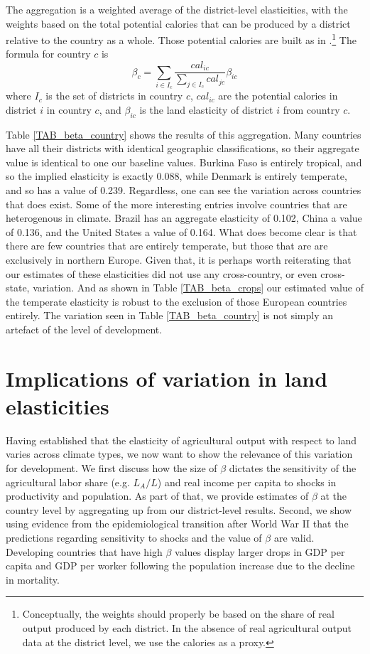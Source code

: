 \documentclass[11pt]{article}
\begin{document}
The aggregation is a weighted average of the district-level elasticities, with the weights based on the total potential calories that can be produced by a district relative to the country as a whole. Those potential calories are built as in \citet{galorozak2016}.\footnote{Conceptually, the weights should properly be based on the share of real output produced by each district. In the absence of real agricultural output data at the district level, we use the calories as a proxy.} The formula for country $c$ is
\begin{equation}
 	\beta_c = \sum_{i \in I_c} \frac{cal_{ic}}{\sum_{j \in I_c} cal_{jc}} \beta_{ic}
 \end{equation} 
 where $I_c$ is the set of districts in country $c$, $cal_{ic}$ are the potential calories in district $i$ in country $c$, and $\beta_{ic}$ is the land elasticity of district $i$ from country $c$.

 Table \ref{TAB_beta_country} shows the results of this aggregation. Many countries have all their districts with identical geographic classifications, so their aggregate value is identical to one our baseline values. Burkina Faso is entirely tropical, and so the implied elasticity is exactly 0.088, while Denmark is entirely temperate, and so has a value of 0.239. Regardless, one can see the variation across countries that does exist. Some of the more interesting entries involve countries that are heterogenous in climate. Brazil has an aggregate elasticity of 0.102, China a value of 0.136, and the United States a value of 0.164. What does become clear is that there are few countries that are entirely temperate, but those that are are exclusively in northern Europe. Given that, it is perhaps worth reiterating that our estimates of these elasticities did not use any cross-country, or even cross-state, variation. And as shown in Table \ref{TAB_beta_crops} our estimated value of the temperate elasticity is robust to the exclusion of those European countries entirely. The variation seen in Table \ref{TAB_beta_country} is not simply an artefact of the level of development.

\section{Implications of variation in land elasticities}\label{SEC_implications}
Having established that the elasticity of agricultural output with respect to land varies across climate types, we now want to show the relevance of this variation for development. We first discuss how the size of $\beta$ dictates the sensitivity of the agricultural labor share (e.g. $L_A/L$) and real income per capita to shocks in productivity and population. As part of that, we provide estimates of $\beta$ at the country level by aggregating up from our district-level results. Second, we show using evidence from the epidemiological transition after World War II that the predictions regarding sensitivity to shocks and the value of $\beta$ are valid. Developing countries that have high $\beta$ values display larger drops in GDP per capita and GDP per worker following the population increase due to the decline in mortality.
\end{document}
